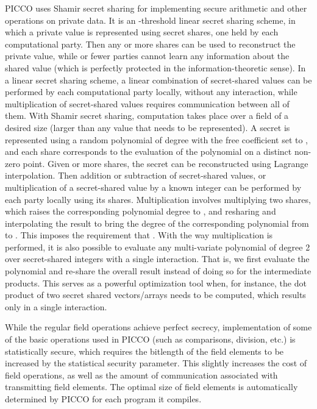 \documentclass[11pt]{article}
\begin{document}
PICCO uses Shamir secret sharing \cite{sha79} for implementing secure
arithmetic and other operations on private data. It is an -threshold
linear secret sharing scheme, in which a private value is represented using
 secret shares, one held by each computational party. Then any 
or more shares can be used to reconstruct the private value, while  or
fewer parties cannot learn any information about the shared value (which is
perfectly protected in the information-theoretic sense). In a linear secret
sharing scheme, a linear combination of secret-shared values can be
performed by each computational party locally, without any interaction,
while multiplication of secret-shared values requires communication between
all of them. With Shamir secret sharing, computation takes place over a
field of a desired size (larger than any value that needs to be
represented). A secret  is represented using a random polynomial of
degree  with the free coefficient set to , and each share corresponds
to the evaluation of the polynomial on a distinct non-zero point. Given
 or more shares, the secret can be reconstructed using Lagrange
interpolation. Then addition or subtraction of secret-shared values, or
multiplication of a secret-shared value by a known integer can be performed
by each party locally using its shares. Multiplication involves multiplying
two shares, which raises the corresponding polynomial degree to , and
resharing and interpolating the result to bring the degree of the
corresponding polynomial from  to . This imposes the requirement that
. With the way multiplication is performed, it is also possible to
evaluate any multi-variate polynomial of degree 2 over secret-shared
integers with a single interaction. That is, we first evaluate the
polynomial and re-share the overall result instead of doing so for the
intermediate products. This serves as a powerful optimization tool when, for
instance, the dot product of two secret shared vectors/arrays needs to be
computed, which results only in a single interaction.

While the regular field operations achieve perfect secrecy, implementation
of some of the basic operations used in PICCO (such as comparisons,
division, etc.) is statistically secure, which requires the bitlength of
the field elements to be increased by the statistical security parameter.
This slightly increases the cost of field operations, as well as the amount of
communication associated with transmitting field elements. The optimal size of
field elements is automatically determined by PICCO for each program it
compiles.
\end{document}
